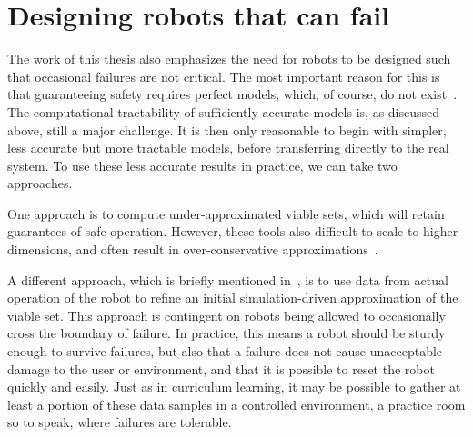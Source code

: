 

\section{Designing robots that can fail}
The work of this thesis also emphasizes the need for robots to be designed such that occasional failures are not critical. The most important reason for this is that guaranteeing safety requires perfect models, which, of course, do not exist~\cite{box1976science}. The computational tractability of sufficiently accurate models is, as discussed above, still a major challenge. It is then only reasonable to begin with simpler, less accurate but more tractable models, before transferring directly to the real system. To use these less accurate results in practice, we can take two approaches. \par
One approach is to compute under-approximated viable sets, which will retain guarantees of safe operation. However, these tools also difficult to scale to higher dimensions, and often result in over-conservative approximations~\cite{manchester2011regions}. \par
A different approach, which is briefly mentioned in~\cite{heim2019learnable}, is to use data from actual operation of the robot to refine an initial simulation-driven approximation of the viable set. This approach is contingent on robots being allowed to occasionally cross the boundary of failure. In practice, this means a robot should be sturdy enough to survive failures, but also that a failure does not cause unacceptable damage to the user or environment, and that it is possible to reset the robot quickly and easily. Just as in curriculum learning, it may be possible to gather at least a portion of these data samples in a controlled environment, a practice room so to speak, where failures are tolerable. \par

